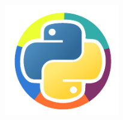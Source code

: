 \sommaire

\vfill
\begin{center}
 \includegraphics[width=5cm]{images/logo_afpy_v3.pdf}
\end{center}
 \vfill



